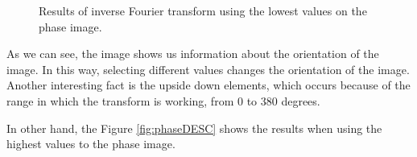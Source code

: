 \documentclass[12pt,a4paper]{article}
\begin{document}
\begin{itemize}
\begin{figure}[!h]
{		}
		\quad
		\quad
		
		\caption{Results of inverse Fourier transform using the lowest values on the phase image.}
		\label{fig:phaseINC}
	\end{figure}
	
	As we can see, the image shows us information about the orientation of the image. In this way, selecting different values changes the orientation of the image. Another interesting fact is the upside down elements, which occurs because of the range in which the transform is working, from 0 to 380 degrees.
	
	In other hand, the Figure \ref{fig:phaseDESC} shows the results when using the highest values to the phase image.
	

\end{itemize}
\end{document}
